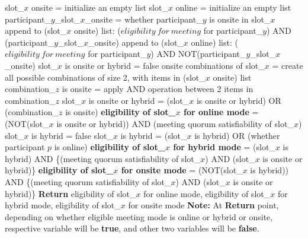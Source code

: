 \begin{algorithm}[H]
\begin{algorithmic}[1]
            \State slot\_\(x\) onsite = initialize an empty list
            \State slot\_\(x\) online = initialize an empty list
                \State participant\_\(y\)\_slot\_\(x\)\_onsite = whether participant\_\(y\) is onsite in slot\_\(x\)
                \State append to (slot\_\(x\) onsite) list: (\(eligibility\ for\ meeting\) for participant\_\(y\)) AND (participant\_\(y\)\_slot\_\(x\)\_onsite)
                \State append to (slot\_\(x\) online) list: (\(eligibility\ for\ meeting\) for participant\_\(y\)) AND NOT(participant\_\(y\)\_slot\_\(x\)\_onsite)
            \EndFor
            \State slot\_\(x\) is onsite or hybrid = false
            \State onsite combinations of slot\_\(x\) = create all possible combinations of size 2, with items in (slot\_\(x\) onsite) list
                \State combination\_\(z\) is onsite = apply AND operation between 2 items in combination\_\(z\)
                \State slot\_\(x\) is onsite or hybrid = (slot\_\(x\) is onsite or hybrid) OR (combination\_\(z\) is onsite)
            \EndFor
            \State \textbf{eligibility of slot\_\(x\) for online mode} = (NOT(slot\_\(x\) is onsite or hybrid)) AND (meeting quorum satisfiability of slot\_\(x\))
            \State slot\_\(x\) is hybrid = false
                \State slot\_\(x\) is hybrid = (slot\_\(x\) is hybrid) OR (whether participant \(p\) is online)
            \EndFor
            \State \textbf{eligibility of slot\_\(x\) for hybrid mode} = (slot\_\(x\) is hybrid) AND \{(meeting quorum satisfiability of slot\_\(x\)) AND (slot\_\(x\) is onsite or hybrid)\}
            \State \textbf{eligibility of slot\_\(x\) for onsite mode} = (NOT(slot\_\(x\) is hybrid)) AND \{(meeting quorum satisfiability of slot\_\(x\)) AND (slot\_\(x\) is onsite or hybrid)\}
            \State \textbf{Return} eligibility of slot\_\(x\) for online mode, eligibility of slot\_\(x\) for hybrid mode, eligibility of slot\_\(x\) for onsite mode
            \State \textbf{Note:} At \textbf{Return} point, depending on whether eligible meeting mode is online or hybrid or onsite, respective variable will be \textbf{true}, and other two variables will be \textbf{false}.
        \EndFor
    \end{algorithmic}
\end{algorithm}
